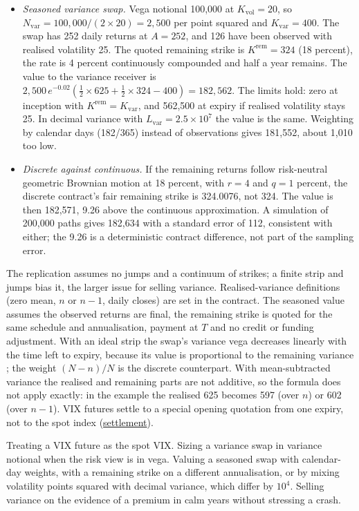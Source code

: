 \begin{qfmethod}
\begin{itemize}
\item \emph{Seasoned variance swap.} Vega notional 100{,}000 at $K_{\text{vol}}=20$, so $N_{\text{var}}=100{,}000/(2\times20)=2{,}500$ per point squared and $K_{\text{var}}=400$. The swap has 252 daily returns at $A=252$, and 126 have been observed with realised volatility 25. The quoted remaining strike is $K^{\text{rem}}=324$ (18 percent), the rate is 4 percent continuously compounded and half a year remains. The value to the variance receiver is $2{,}500\,e^{-0.02}(\tfrac12\times625+\tfrac12\times324-400)=182{,}562$. The limits hold: zero at inception with $K^{\text{rem}}=K_{\text{var}}$, and 562{,}500 at expiry if realised volatility stays 25. In decimal variance with $L_{\text{var}}=2.5\times10^7$ the value is the same. Weighting by calendar days (182/365) instead of observations gives 181{,}552, about 1{,}010 too low.
\item \emph{Discrete against continuous.} If the remaining returns follow risk-neutral geometric Brownian motion at 18 percent, with $r=4$ and $q=1$ percent, the discrete contract's fair remaining strike is 324.0076, not 324. The value is then 182{,}571, 9.26 above the continuous approximation. A simulation of 200{,}000 paths gives 182{,}634 with a standard error of 112, consistent with either; the 9.26 is a deterministic contract difference, not part of the sampling error.
\end{itemize}

 The replication assumes no jumps and a continuum of strikes; a finite strip and jumps bias it, the larger issue for selling variance. Realised-variance definitions (zero mean, $n$ or $n-1$, daily closes) are set in the contract. The seasoned value assumes the observed returns are final, the remaining strike is quoted for the same schedule and annualisation, payment at $T$ and no credit or funding adjustment. With an ideal strip the swap's variance vega decreases linearly with the time left to expiry, because its value is proportional to the remaining variance \citep[p.~13]{demeterfi-varswaps-gs-1999}; the weight $(N-n)/N$ is the discrete counterpart. With mean-subtracted variance the realised and remaining parts are not additive, so the formula does not apply exactly: in the example the realised 625 becomes 597 (over $n$) or 602 (over $n-1$). VIX futures settle to a special opening quotation from one expiry, not to the spot index (\hyperref[def:vix-variance-dividend-swaps]{settlement}).

 Treating a VIX future as the spot VIX. Sizing a variance swap in variance notional when the risk view is in vega. Valuing a seasoned swap with calendar-day weights, with a remaining strike on a different annualisation, or by mixing volatility points squared with decimal variance, which differ by $10^4$. Selling variance on the evidence of a premium in calm years without stressing a crash.


\end{qfmethod}
